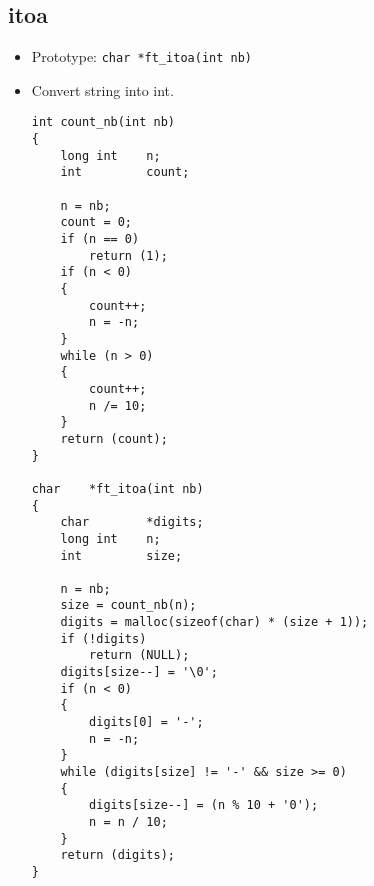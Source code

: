 \documentclass{article}
\begin{document}
	\subsection{itoa}
		\begin{itemize}[label=$\rightarrow$]
			\item Prototype: \texttt{char *ft\_itoa(int nb)}
			\item Convert string into int.
			\begin{verbatim}
int	count_nb(int nb)
{
	long int	n;
	int			count;

	n = nb;
	count = 0;
	if (n == 0)
		return (1);
	if (n < 0)
	{
		count++;
		n = -n;
	}
	while (n > 0)
	{
		count++;
		n /= 10;
	}
	return (count);
}

char	*ft_itoa(int nb)
{
	char		*digits;
	long int	n;
	int			size;

	n = nb;
	size = count_nb(n);
	digits = malloc(sizeof(char) * (size + 1));
	if (!digits)
		return (NULL);
	digits[size--] = '\0';
	if (n < 0)
	{
		digits[0] = '-';
		n = -n;
	}
	while (digits[size] != '-' && size >= 0)
	{
		digits[size--] = (n % 10 + '0');
		n = n / 10;
	}
	return (digits);
}
			\end{verbatim}
		\end{itemize}
	
\end{document}
